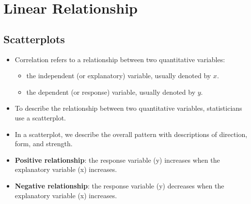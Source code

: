 
\hypertarget{linear-relationship}{%
\section{Linear Relationship}\label{linear-relationship}}

\hypertarget{scatterplots}{%
\subsection{Scatterplots}\label{scatterplots}}

\begin{itemize}
\item
  Correlation refers to a relationship between two quantitative
  variables:

  \begin{itemize}
  \item
    the independent (or explanatory) variable, usually denoted by \(x\).
  \item
    the dependent (or response) variable, usually denoted by \(y\).
  \end{itemize}
\item
  To describe the relationship between two quantitative variables,
  statisticians use a scatterplot.
\item
  In a scatterplot, we describe the overall pattern with descriptions of
  direction, form, and strength.
\item
  \textbf{Positive relationship}: the response variable (y) increases
  when the explanatory variable (x) increases.

    \item
  \textbf{Negative relationship}: the response variable (y) decreases
  when the explanatory variable (x) increases.

\end{itemize}
